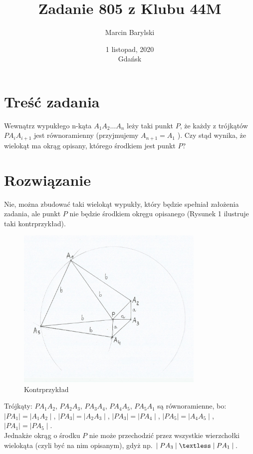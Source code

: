 \documentclass[10pt,onecolumn]{article}
\title{Zadanie 805 z Klubu 44M}
\author{Marcin Barylski}
\date{\small{1 listopad, 2020 \\ Gdańsk}}
\begin{document}
\maketitle

\section{Treść zadania}

Wewnątrz wypukłego n-kąta $A_1 A_2 \dots A_n$  leży taki punkt $P$,  że każdy z trójkątów $P A_i A_{i+1}$  jest równoramienny (przyjmujemy $A_{n+1}=A_1$  ). Czy stąd wynika, że wielokąt ma okrąg opisany, którego środkiem jest punkt $P$? 

\section{Rozwiązanie}

Nie, można zbudować taki wielokąt wypukły, który będzie spełniał założenia zadania, ale punkt $P$ nie będzie środkiem okręgu opisanego (Rysunek 1 ilustruje taki kontrprzykład).

\begin{figure}[!ht]
\centering
\captionsetup{justification=centering}
\includegraphics[width=9cm]{rys_1}
\caption[caption]{Kontrprzykład}
\label{fig:rys1}
\end{figure}

Trójkąty: $P A_1 A_2$, $P A_2 A_3$, $P A_3 A_4$, $P A_4 A_5$, $P A_5 A_1$ są równoramienne, bo: \\ $\mid P A_1 \mid = \mid A_1 A_2 \mid$, $\mid P A_3 \mid = \mid A_2 A_3 \mid$, $\mid P A_3 \mid = \mid P A_4 \mid$, $\mid P A_5 \mid = \mid A_4 A_5 \mid$, $\mid P A_1 \mid = \mid P A_5 \mid$. \\
Jednakże okrąg o środku $P$ nie może przechodzić przez wszystkie wierzchołki wielokąta (czyli być na nim opisanym), gdyż np. $\mid P A_3 \mid \textless \mid P A_1 \mid$.
\end{document}
